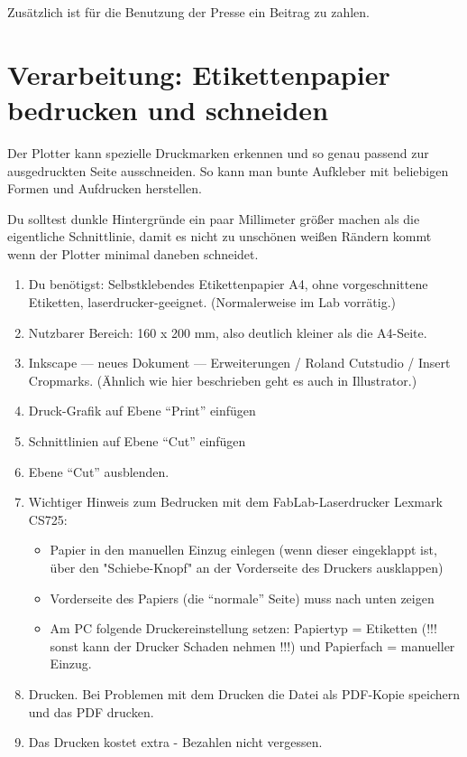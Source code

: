 \documentclass{\basedir/fablab-document}
\begin{document}
Zusätzlich ist für die Benutzung der Presse ein Beitrag zu zahlen.

\section{Verarbeitung: Etikettenpapier bedrucken und schneiden}

Der Plotter kann spezielle Druckmarken erkennen und so genau passend zur ausgedruckten Seite ausschneiden. So kann man bunte Aufkleber mit beliebigen Formen und Aufdrucken herstellen.

Du solltest dunkle Hintergründe ein paar Millimeter größer machen als die eigentliche Schnittlinie, damit es nicht zu unschönen weißen Rändern kommt wenn der Plotter minimal daneben schneidet.

\begin{enumerate}
\item Du benötigst: Selbstklebendes Etikettenpapier A4, ohne vorgeschnittene Etiketten, laserdrucker-geeignet. (Normalerweise im Lab vorrätig.)
\item Nutzbarer Bereich: 160 x 200 mm, also deutlich kleiner als die A4-Seite.
\item Inkscape --- neues Dokument --- Erweiterungen / Roland Cutstudio / Insert Cropmarks. (Ähnlich wie hier beschrieben geht es auch in Illustrator.)
\item Druck-Grafik auf Ebene \enquote{Print} einfügen
\item Schnittlinien auf Ebene \enquote{Cut} einfügen
\item Ebene \enquote{Cut} ausblenden.
\item Wichtiger Hinweis zum Bedrucken mit dem FabLab-Laserdrucker Lexmark CS725:
    \begin{itemize}
    \item Papier in den manuellen Einzug einlegen (wenn dieser eingeklappt ist, über den "Schiebe-Knopf" an der Vorderseite des Druckers ausklappen)
    \item Vorderseite des Papiers (die \enquote{normale} Seite) muss nach unten zeigen
    \item Am PC folgende Druckereinstellung setzen: Papiertyp = Etiketten (!!! sonst kann der Drucker Schaden nehmen !!!) und Papierfach = manueller Einzug.
    \end{itemize}
\item Drucken. Bei Problemen mit dem Drucken die Datei als PDF-Kopie speichern und das PDF drucken.
\item Das Drucken kostet extra - Bezahlen nicht vergessen.

\end{enumerate}
\end{document}
